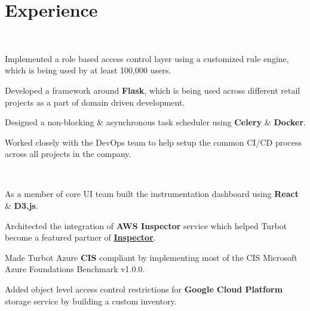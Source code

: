 \documentclass[]{hieudo-build}
\begin{document}
\begin{minipage}[t]{0.65\textwidth} 

\section{Experience}

\\
\vspace{0.9em} %
\begin{tightemize}
		\item Implemented a role based access control layer using a customized rule engine, which is being used by at least 100,000 users.
		\item Developed a framework around {\textbf{Flask}}, which is being used across different retail projects as a part of domain driven development.
		\item Designed a non-blocking \& asynchronous task scheduler using {\textbf{Celery}} \& {\textbf{Docker}}.
		\item Worked closely with the DevOps team to help setup the common CI/CD process across all
		projects in the company.
\end{tightemize}
\sectionsep

 \\
\begin{tightemize}
        \item As a member of core UI team built the instrumentation dashboard using {\textbf{React}} \& {\textbf{D3.js}}.
        \item Architected the integration of \textbf{AWS Inspector} service which helped Turbot become a featured partner of \href{https://aws.amazon.com/inspector/partners/}{\textbf{Inspector}}.
        \item Made Turbot Azure \textbf{CIS} compliant by implementing most of the CIS Microsoft Azure Foundations Benchmark v1.0.0.
        \item Added object level access control restrictions for \textbf{Google Cloud Platform} storage service by building a custom inventory.
\end{tightemize}
\sectionsep


\end{minipage}
\end{document}
